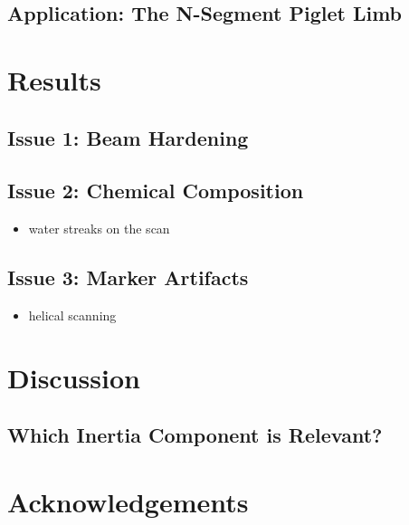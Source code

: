 \subsection{Application: The N-Segment Piglet Limb}
\label{sec:org5321bfb}

\section{Results}
\label{sec:orgff6d7a6}
\subsection{Issue 1: Beam Hardening}
\label{sec:orgeb51aa9}
\subsection{Issue 2: Chemical Composition}
\label{sec:orgf412c36}
\begin{itemize}
\item water streaks on the scan
\end{itemize}
\subsection{Issue 3: Marker Artifacts}
\label{sec:orgdc3358c}
\begin{itemize}
\item helical scanning
\end{itemize}

\section{Discussion}
\label{sec:org4195f4b}
\subsection{Which Inertia Component is Relevant?}
\label{sec:orgb3e7c4f}


\section{Acknowledgements}
\label{sec:orgdc4f21e}
\pagebreak

% 
% 
